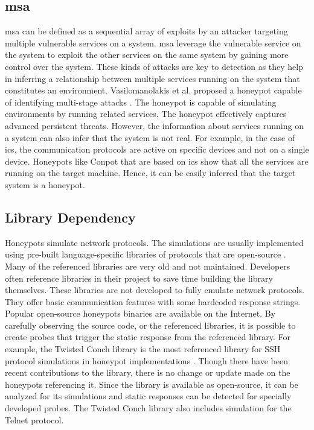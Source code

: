 \subsection{\acrfull{msa}}
\acrlong{msa} can be defined as a sequential array of exploits by an attacker targeting multiple vulnerable services on a system. \acrshort{msa} leverage the vulnerable service on the system to exploit the other services on the same system by gaining more control over the system. These kinds of attacks are key to detection as they help in inferring a relationship between multiple services running on the system that constitutes an environment. Vasilomanolakis et al. proposed a honeypot capable of identifying multi-stage attacks  \cite{vasilomanolakis}. The honeypot is capable of simulating environments by running related services. The honeypot effectively captures advanced persistent threats. However, the information about services running on a system can also infer that the system is not real. For example, in the case of \acrshort{ics}, the communication protocols are active on specific devices and not on a single device. Honeypots like Conpot that are based on \acrshort{ics} show that all the services are running on the target machine. Hence, it can be easily inferred that the target system is a honeypot. 

\subsection{Library Dependency}
Honeypots simulate network protocols. The simulations are usually implemented using pre-built language-specific libraries of protocols that are open-source \cite{Vetterl2018}. Many of the referenced libraries are very old and not maintained. Developers often reference libraries in their project to save time building the library themselves. These libraries are not developed to fully emulate network protocols. They offer basic communication features with some hardcoded response strings. Popular open-source honeypots binaries are available on the Internet. By carefully observing the source code, or the referenced libraries, it is possible to create probes that trigger the static response from the referenced library. For example, the Twisted Conch  library is the most referenced library for SSH protocol simulations in honeypot implementations\cite{twisted}  \cite{counting} . Though there have been recent contributions to the library, there is no change or update made on the honeypots referencing it. Since the library is available as open-source, it can be analyzed for its simulations and static responses can be detected for specially developed probes. The Twisted Conch library also includes simulation for the Telnet protocol. 

